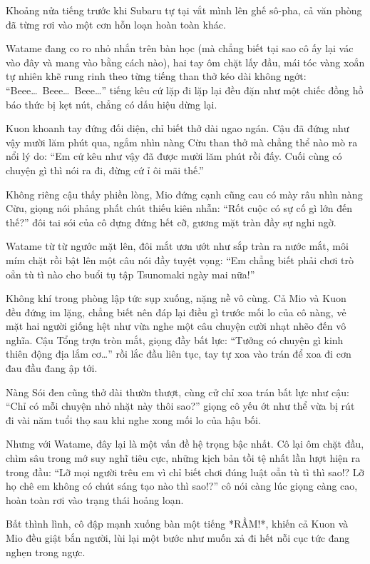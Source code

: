 \documentclass[../main.tex]{subfiles}
\begin{document}
Khoảng nửa tiếng trước khi Subaru tự tại vắt mình lên ghế sô-pha, cả văn phòng đã từng rơi vào một cơn hỗn loạn hoàn toàn khác.

Watame đang co ro nhỏ nhắn trên bàn học (mà chẳng biết tại sao cô ấy lại vác vào đây và mang vào bằng cách nào), hai tay ôm chặt lấy đầu, mái tóc vàng xoắn tự nhiên khẽ rung rinh theo từng tiếng than thở kéo dài không ngớt: ``Beee\dots\ Beee\dots\ Beee\dots'' tiếng kêu cứ lặp đi lặp lại đều đặn như một chiếc đồng hồ báo thức bị kẹt nút, chẳng có dấu hiệu dừng lại.


Kuon khoanh tay đứng đối diện, chỉ biết thở dài ngao ngán. Cậu đã đứng như vậy mười lăm phút qua, ngắm nhìn nàng Cừu than thở mà chẳng thể nào mò ra nổi lý do: ``Em cứ kêu như vậy đã được mười lăm phút rồi đấy. Cuối cùng có chuyện gì thì nói ra đi, đừng cứ ỉ ôi mãi thế.''

Không riêng cậu thấy phiền lòng, Mio đứng cạnh cũng cau có mày râu nhìn nàng Cừu, giọng nói phảng phất chút thiếu kiên nhẫn: ``Rốt cuộc có sự cố gì lớn đến thế?'' đôi tai sói của cô dựng đứng hết cỡ, gương mặt tràn đầy sự nghi ngờ.

Watame từ từ ngước mặt lên, đôi mắt ươn ướt như sắp tràn ra nước mắt, môi mím chặt rồi bật lên một câu nói đầy tuyệt vọng: ``Em chẳng biết phải chơi trò oẳn tù tì nào cho buổi tụ tập Tsunomaki ngày mai nữa!''

Không khí trong phòng lập tức sụp xuống, nặng nề vô cùng. Cả Mio và Kuon đều đứng im lặng, chẳng biết nên đáp lại điều gì trước mối lo của cô nàng, vẻ mặt hai người giống hệt như vừa nghe một câu chuyện cười nhạt nhẽo đến vô nghĩa. Cậu Tổng trợn tròn mắt, giọng đầy bất lực: ``Tưởng có chuyện gì kinh thiên động địa lắm cơ\dots'' rồi lắc đầu liên tục, tay tự xoa vào trán để xoa đi cơn đau đầu đang ập tới.

Nàng Sói đen cũng thở dài thườn thượt, cùng cử chỉ xoa trán bất lực như cậu: ``Chỉ có mỗi chuyện nhỏ nhặt này thôi sao?'' giọng cô yếu ớt như thể vừa bị rút đi vài năm tuổi thọ sau khi nghe xong mối lo của hậu bối.

Nhưng với Watame, đây lại là một vấn đề hệ trọng bậc nhất. Cô lại ôm chặt đầu, chìm sâu trong mớ suy nghĩ tiêu cực, những kịch bản tồi tệ nhất lần lượt hiện ra trong đầu: ``Lỡ mọi người trêu em vì chỉ biết chơi đúng luật oẳn tù tì thì sao!? Lỡ họ chê em không có chút sáng tạo nào thì sao!?'' cô nói càng lúc giọng càng cao, hoàn toàn rơi vào trạng thái hoảng loạn.

Bất thình lình, cô đập mạnh xuống bàn một tiếng *RẦM!*, khiến cả Kuon và Mio đều giật bắn người, lùi lại một bước như muốn xả đi hết nỗi cục tức đang nghẹn trong ngực.
\end{document}
